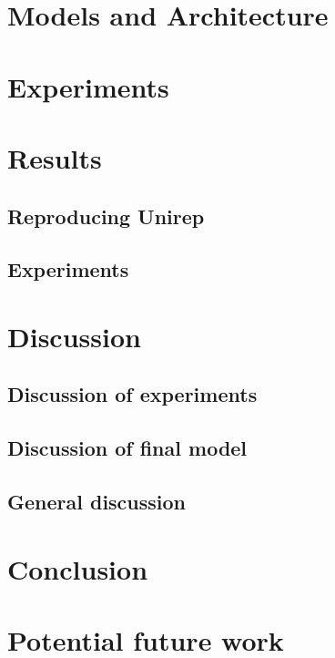 \documentclass[a4paper]{article}
\begin{document}

\section{Models and Architecture}

\section{Experiments}


\section{Results}
\subsection{Reproducing Unirep}
\subsection{Experiments}

\section{Discussion}
\subsection{Discussion of experiments}
\subsection{Discussion of final model}
\subsection{General discussion}

\section{Conclusion}

\section{Potential future work}



{}

\end{document}
